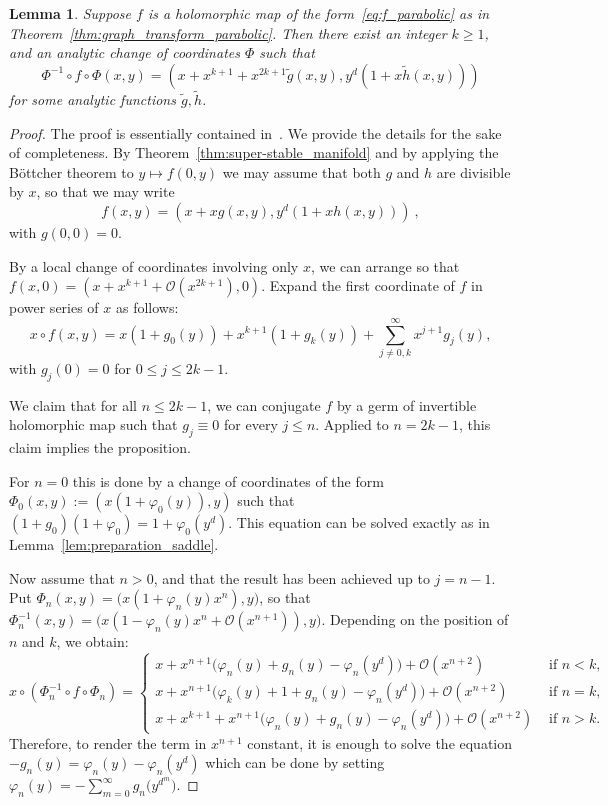 \documentclass[11 pt, oneside, a4paper]{amsart}
\newcommand{\inv}{^{-1}}
\newtheorem{lem}[thm]{Lemma}
\theoremstyle{definition}
\theoremstyle{definition}
\begin{document}
 
 \begin{lem}\label{lem:preparation_parabolic}
Suppose $f$ is a holomorphic map of the form~\eqref{eq:f_parabolic} as in Theorem~\ref{thm:graph_transform_parabolic}.
Then there exist an integer $k\ge1$, and an analytic change of coordinates $\Phi$ such that
\[
\Phi^{-1} \circ f \circ \Phi (x,y)=
 (x + x^{k+1}+ x^{2k+1} \tilde{g}(x,y), y^d(1+x \tilde{h}(x,y)))
\]
for some analytic functions $\tilde{g}, \tilde{h}$.
\end{lem}

\begin{proof}
The proof is essentially contained in~\cite[Proposition 2.3]{hakim}. We provide the details for the sake of completeness. 
By Theorem~\ref{thm:super-stable_manifold} and by applying the Böttcher 
  theorem to $y\mapsto f(0,y)$ we may assume that both $g$ and $h$ are divisible by $x$, 
so that  we may write
\begin{equation}\label{eq:f_parabolic2} 
f(x,y) =  \left(x + x g(x,y) , y^d(1+x h(x,y))\right) ~,
\end{equation}
with $g(0,0)=0$.

By a local change of coordinates involving only  $x$, we can arrange so that 
$f(x, 0) = (x +  x^{k+1} + \mathcal{O}(x^{2k+1}), 0)$.  
Expand the first coordinate of $f$ in power series of $x$ as follows:
$$x \circ f(x,y) =  x (1+g_0(y)) + x^{k+1} (1+ g_k(y))+ \sum_{j\neq 0,k}^\infty x^{j+1}g_j(y),$$ with $g_j(0)  = 0$ for $0 \leq j \leq 2k-1$.  

We claim that  for all $n \leq 2k-1$, we can conjugate $f$ by a germ of invertible holomorphic  map such that $g_j \equiv 0$ for every $j\leq n$. Applied to  $n=2k-1$, this claim implies the proposition.

For $n=0$ this is done by a change of coordinates of the 
form $\Phi_0(x,y):= (x(1+\varphi_0(y)), y)$ such that 
$(1+g_0) (1+\varphi_0) = 1+\varphi_0(y^d)$. This equation can be solved exactly 
as  in Lemma~\ref{lem:preparation_saddle}. 

Now assume that $n>0$, and that the result has been achieved up to $j = n-1$.
Put $\Phi_n(x,y) = \big(x(1+ \varphi_n(y) x^{n}), y\big)$, so that $\Phi_n\inv(x,y) = \big(x(1 - \varphi_n(y)x^{n} + \mathcal{O}(x^{n+1})), y\big)$.
Depending on the position of $n$ and $k$, we obtain: 
\[
x \circ ( \Phi_n\inv  \circ f \circ \Phi_n)=
\begin{cases}
x + x^{n+1} \big(\varphi_n(y)+g_n(y) - \varphi_n(y^d)\big)+  \mathcal{O}(x^{n+2})
& \text{ if } n <k,
\\
x + x^{n+1} \big(\varphi_k(y)+1+g_n(y) - \varphi_n(y^d)\big) +  \mathcal{O}(x^{n+2})
& \text{ if }  n=k,
\\
x + x^{k+1} + x^{n+1} \big(\varphi_n(y)+g_n(y) - \varphi_n(y^d)\big) + \mathcal{O}(x^{n+2})
& \text{ if }  n>k.
\end{cases} 
\]
Therefore, to render the term in $x^{n+1}$ constant, it is 
enough to solve the equation $-g_n(y) = \varphi_n(y) - \varphi_n(y^d)$ which can be done by setting 
$\varphi_n(y) =  - \sum_{m=0}^\infty g_n\big(y^{d^m}\big)$. 
\end{proof}
\end{document}
